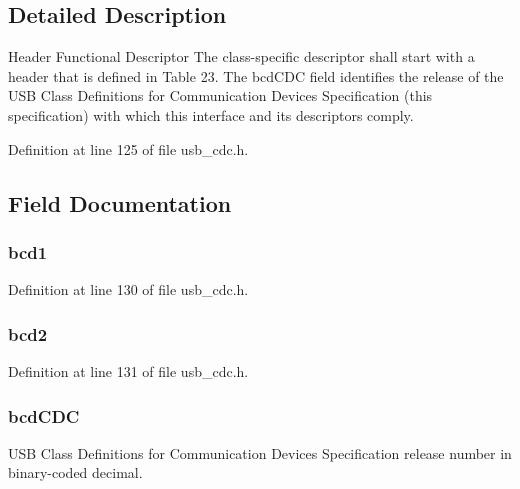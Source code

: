 \subsection{Detailed Description}
Header Functional Descriptor The class-\/specific descriptor shall start with a header that is defined in Table 23. The bcd\-C\-D\-C field identifies the release of the U\-S\-B Class Definitions for Communication Devices Specification (this specification) with which this interface and its descriptors comply. 

Definition at line 125 of file usb\-\_\-cdc.\-h.



\subsection{Field Documentation}
\hypertarget{struct_u_s_b___header___functional___descriptor_ae66728fcd4b92b9f339d30cd96eb53d1}{
\subsubsection[{bcd1}]{ bcd1}}\label{struct_u_s_b___header___functional___descriptor_ae66728fcd4b92b9f339d30cd96eb53d1}


Definition at line 130 of file usb\-\_\-cdc.\-h.

\hypertarget{struct_u_s_b___header___functional___descriptor_ab9350b3e1d0773cc36278d17a911f4a3}{
\subsubsection[{bcd2}]{ bcd2}}\label{struct_u_s_b___header___functional___descriptor_ab9350b3e1d0773cc36278d17a911f4a3}


Definition at line 131 of file usb\-\_\-cdc.\-h.

\hypertarget{struct_u_s_b___header___functional___descriptor_a09fd31ebbad300f5c9686156363a5438}{
\subsubsection[{bcd\-C\-D\-C}]{ bcd\-C\-D\-C}}\label{struct_u_s_b___header___functional___descriptor_a09fd31ebbad300f5c9686156363a5438}
U\-S\-B Class Definitions for Communication Devices Specification release number in binary-\/coded decimal. 


